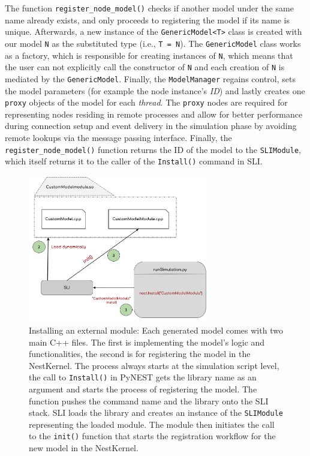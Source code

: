 The function \texttt{register\_node\_model()} checks if another model under the same name already exists, and only proceeds to registering the model if its name is unique. Afterwards, a new instance of the \texttt{GenericModel<T>} class is created with our model \texttt{N} as the substituted type (i.e., \texttt{T = N}). The \texttt{GenericModel} class works as a factory, which is responsible for creating instances of \texttt{N}, which means that the user can not explicitly call the constructor of \texttt{N} and each creation of \texttt{N} is mediated by the \texttt{GenericModel}. Finally, the \texttt{ModelManager} regains control, sets the model parameters (for example the node instance's \emph{ID}) and lastly creates one \texttt{proxy} objects of the model for each \emph{thread}. The \texttt{proxy} nodes are required for representing nodes residing in remote processes and allow for better performance during connection setup and event delivery in the simulation phase by avoiding remote lookups via the message passing interface. Finally, the \texttt{register\_node\_model()} function returns the ID of the model to the \texttt{SLIModule}, which itself returns it to the caller of the \texttt{Install()} command in SLI.

\begin{figure}[ht!]
\centering
\includegraphics[width=0.7\textwidth]{src/pic/install_command.png}
\caption{Installing an external module: Each generated model comes with two main C++ files. The first is implementing the model's logic and functionalities, the second is for registering the model in the NestKernel. The process always starts at the simulation script level, the call to \texttt{Install()} in PyNEST gets the library name as an argument and starts the process of registering the model. The function pushes the command name and the library onto the SLI stack. SLI loads the library and creates an instance of the \texttt{SLIModule} representing the loaded module. The module then initiates the call to the \texttt{init()} function that starts the registration workflow for the new model in the NestKernel.}
\label{fig:sli_install}
\end{figure}

